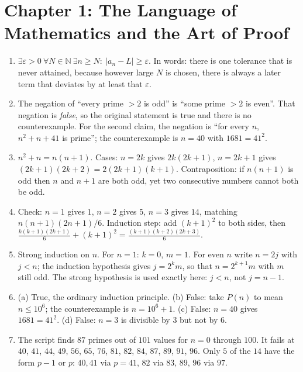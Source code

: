 
\section*{Chapter 1: The Language of Mathematics and the Art of Proof}
\begin{enumerate}[label=\textbf{1.\arabic*}]
  \item $\exists \varepsilon>0\ \forall N\in\mathbb{N}\ \exists n\ge N:\ |a_{n}-L|\ge
        \varepsilon$. In words: there is one tolerance that is never attained,
        because however large $N$ is chosen, there is always a later term that
        deviates by at least that $\varepsilon$.

  \item The negation of ``every prime $>2$ is odd'' is ``some prime $>2$ is even''.
        That negation is \emph{false}, so the original statement is true and there is
        no counterexample. For the second claim, the negation is ``for every $n$,
        $n^{2}+n+41$ is prime''; the counterexample is $n=40$ with $1681=41^{2}$.

  \item $n^{2}+n=n(n+1)$. Cases: $n=2k$ gives $2k(2k+1)$, $n=2k+1$ gives
        $(2k+1)(2k+2)=2(2k+1)(k+1)$. Contraposition: if $n(n+1)$ is odd then $n$
        and $n+1$ are both odd, yet two consecutive numbers cannot both be odd.

  \item Check: $n=1$ gives $1$, $n=2$ gives $5$, $n=3$ gives $14$, matching
        $n(n+1)(2n+1)/6$. Induction step: add $(k+1)^{2}$ to both sides, then
        $\frac{k(k+1)(2k+1)}{6}+(k+1)^{2}=\frac{(k+1)(k+2)(2k+3)}{6}$.

  \item Strong induction on $n$. For $n=1$: $k=0$, $m=1$. For even $n$ write
        $n=2j$ with $j<n$; the induction hypothesis gives $j=2^{k}m$, so that
        $n=2^{k+1}m$ with $m$ still odd. The strong hypothesis is used exactly here:
        $j<n$, not $j=n-1$.

  \item (a) True, the ordinary induction principle. (b) False: take $P(n)$ to mean
        $n\le 10^{6}$; the counterexample is $n=10^{6}+1$. (c) False: $n=40$ gives
        $1681=41^{2}$. (d) False: $n=3$ is divisible by $3$ but not by $6$.

  \item The script finds $87$ primes out of $101$ values for $n=0$ through $100$. It
        fails at $40$, $41$, $44$, $49$, $56$, $65$, $76$, $81$, $82$, $84$, $87$, $89$,
        $91$, $96$. Only $5$ of the $14$ have the form $p-1$ or $p$: $40,41$ via
        $p=41$, $82$ via $83$, $89$, $96$ via $97$.


\end{enumerate}
